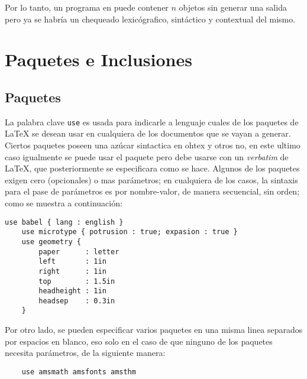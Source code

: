 \documentclass[12pt,letterpaper,titlepage,oneside,openright]{book}
\newcommand{\OhTeX}{%
    \makebox[0.76em][c]{O}%
    \makebox[0.25em][c]{%
        \raisebox{0.14em}[0em][0em]{%
            \fontsize{0.5em}{0cm}%
                \selectfont H%
        }%
    }%
    \makebox[1.35em][c]{\TeX}%
}
\newcommand{\latex}{\LaTeX\xspace}
\newcommand{\ohtex}{\OhTeX\xspace}
\begin{document}
Por lo tanto, un programa en \ohtex puede contener $n$ objetos sin generar una salida pero ya se habría un chequeado lexicógrafico, sintáctico y contextual del mismo. 

\section{Paquetes e Inclusiones}

\subsection{Paquetes}

La palabra clave \texttt{use} es usada para indicarle a lenguaje cuales de los
paquetes de \latex se desean usar en cualquiera de los documentos que se vayan a
generar. Ciertos paquetes poseen una azúcar sintactica en ohtex y otros no, en este ultimo caso igualmente se puede usar el paquete pero debe usarse con un \textit{verbatim} de \latex, que posteriormente se especificara como se hace. Algunos de los paquetes exigen cero (opcionales) o mas parámetros; en
cualquiera de los casos, la sintaxis para el pase de parámetros es por nombre-valor, de manera secuencial, sin orden; 
como se muestra a continuación:

\begin{center}
\begin{minipage}{\linewidth}
\begin{lstlisting}[caption={Paquetes},label=pkgs]
    use babel { lang : english }
    use microtype { potrusion : true; expasion : true }
    use geometry {
        paper      : letter
        left       : 1in
        right      : 1in
        top        : 1.5in
        headheight : 1in
        headsep    : 0.3in
    }
\end{lstlisting}
\end{minipage}
\end{center}

Por otro lado, se pueden especificar varios paquetes en una misma linea separados por espacios en blanco, eso
solo en el caso de que ninguno de los paquetes necesita parámetros, de la
siguiente manera:

\begin{center}
\begin{minipage}{\linewidth}
\begin{lstlisting}
    use amsmath amsfonts amsthm
\end{lstlisting}
\end{minipage}
\end{center}
\end{document}
